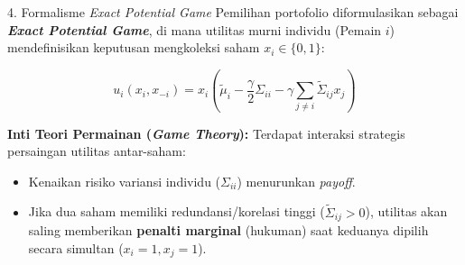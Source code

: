 \begin{frame}{4. Formalisme \textit{Exact Potential Game}}
Pemilihan portofolio diformulasikan sebagai \textbf{\textit{Exact Potential Game}}, di mana utilitas murni individu (Pemain $i$) mendefinisikan keputusan mengkoleksi saham $x_i \in \{0, 1\}$:

$$ u_i(x_i, x_{-i}) = x_i \left( \tilde{\mu}_i - \frac{\gamma}{2}\Sigma_{ii} - \gamma \sum_{j \neq i} \tilde{\Sigma}_{ij} x_j \right) $$

\textbf{Inti Teori Permainan (\textit{Game Theory}):}
Terdapat interaksi strategis persaingan utilitas antar-saham:
\begin{itemize}
    \item Kenaikan risiko variansi individu ($\Sigma_{ii}$) menurunkan \textit{payoff}.
    \item Jika dua saham memiliki redundansi/korelasi tinggi ($\tilde{\Sigma}_{ij} > 0$), utilitas akan saling memberikan \textbf{penalti marginal} (hukuman) saat keduanya dipilih secara simultan ($x_i=1, x_j=1$).
\end{itemize}
\end{frame}
